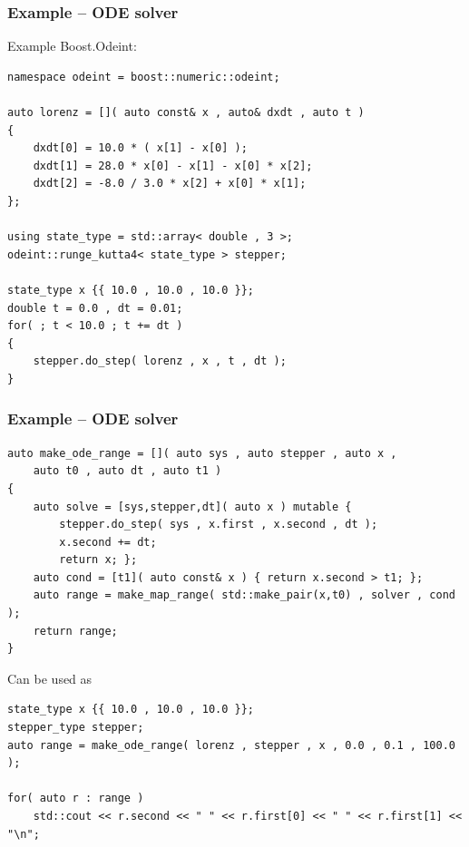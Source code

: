 \documentclass{beamer}
\newcommand{\heading}[1]{\frametitle{#1}}
\newcommand{\odeint}[0]{Boost.Odeint}
\begin{document}
\begin{frame}[fragile]
  \heading{Example -- ODE solver}
  
  Example \odeint:
  
\begin{lstlisting}[basicstyle=\scriptsize\ttfamily]
namespace odeint = boost::numeric::odeint;

auto lorenz = []( auto const& x , auto& dxdt , auto t )
{
    dxdt[0] = 10.0 * ( x[1] - x[0] );
    dxdt[1] = 28.0 * x[0] - x[1] - x[0] * x[2];
    dxdt[2] = -8.0 / 3.0 * x[2] + x[0] * x[1];
};

using state_type = std::array< double , 3 >;
odeint::runge_kutta4< state_type > stepper;

state_type x {{ 10.0 , 10.0 , 10.0 }};
double t = 0.0 , dt = 0.01;
for( ; t < 10.0 ; t += dt )
{
    stepper.do_step( lorenz , x , t , dt );
}
  \end{lstlisting}
  

\end{frame}

\begin{frame}[fragile]
 \heading{Example -- ODE solver}
 
 \begin{lstlisting}[basicstyle=\tiny\ttfamily]
auto make_ode_range = []( auto sys , auto stepper , auto x ,
    auto t0 , auto dt , auto t1 )
{
    auto solve = [sys,stepper,dt]( auto x ) mutable { 
        stepper.do_step( sys , x.first , x.second , dt );
        x.second += dt;
        return x; };
    auto cond = [t1]( auto const& x ) { return x.second > t1; };
    auto range = make_map_range( std::make_pair(x,t0) , solver , cond );
    return range;
}
 \end{lstlisting}
 
 \pause
 Can be used as
\begin{lstlisting}[basicstyle=\tiny\ttfamily]
state_type x {{ 10.0 , 10.0 , 10.0 }};
stepper_type stepper;
auto range = make_ode_range( lorenz , stepper , x , 0.0 , 0.1 , 100.0 );

for( auto r : range )
    std::cout << r.second << " " << r.first[0] << " " << r.first[1] << "\n"; 
\end{lstlisting}

\end{frame}
\end{document}
